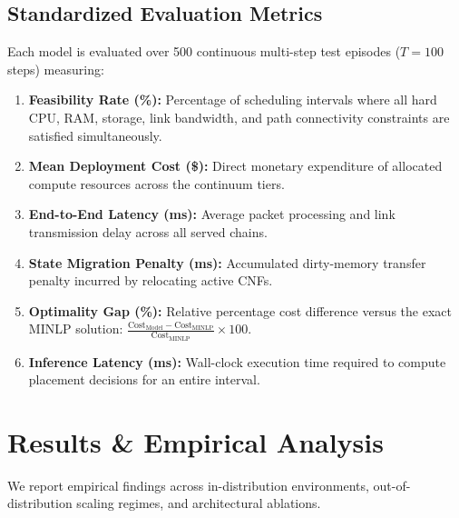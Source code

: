 \documentclass[conference]{IEEEtran}
\begin{document}
\subsection{Standardized Evaluation Metrics}
Each model is evaluated over 500 continuous multi-step test episodes ($T=100$ steps) measuring:
\begin{enumerate}
    \item \textbf{Feasibility Rate (\%):} Percentage of scheduling intervals where all hard CPU, RAM, storage, link bandwidth, and path connectivity constraints are satisfied simultaneously.
    \item \textbf{Mean Deployment Cost (\$):} Direct monetary expenditure of allocated compute resources across the continuum tiers.
    \item \textbf{End-to-End Latency (ms):} Average packet processing and link transmission delay across all served chains.
    \item \textbf{State Migration Penalty (ms):} Accumulated dirty-memory transfer penalty incurred by relocating active CNFs.
    \item \textbf{Optimality Gap (\%):} Relative percentage cost difference versus the exact MINLP solution:
    $\frac{\text{Cost}_{\text{Model}} - \text{Cost}_{\text{MINLP}}}{\text{Cost}_{\text{MINLP}}} \times 100$.
    \item \textbf{Inference Latency (ms):} Wall-clock execution time required to compute placement decisions for an entire interval.
\end{enumerate}

\section{Results \& Empirical Analysis}
\label{sec:results}

We report empirical findings across in-distribution environments, out-of-distribution scaling regimes, and architectural ablations.
\end{document}
